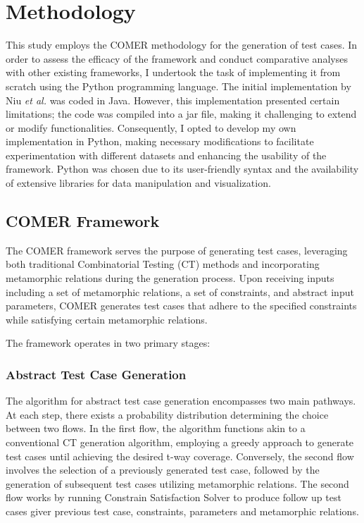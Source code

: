 
\chapter{Methodology}
\label{ch:met}

This study employs the COMER methodology for the generation of test cases.
In order to assess the efficacy of the framework and conduct comparative analyses with other existing frameworks, I undertook the task of implementing it from scratch using the Python programming language.
The initial implementation by Niu \textit{et al.} \cite{comer} was coded in Java.
However, this implementation presented certain limitations; the code was compiled into a jar file, making it challenging to extend or modify functionalities.
Consequently, I opted to develop my own implementation in Python, making necessary modifications to facilitate experimentation with different datasets and enhancing the usability of the framework.
Python was chosen due to its user-friendly syntax and the availability of extensive libraries for data manipulation and visualization.


\section{COMER Framework}\label{sec:comer-framework}

The COMER framework serves the purpose of generating test cases, leveraging both traditional Combinatorial Testing (CT) methods and incorporating metamorphic relations during the generation process.
Upon receiving inputs including a set of metamorphic relations, a set of constraints, and abstract input parameters, COMER generates test cases that adhere to the specified constraints while satisfying certain metamorphic relations.

The framework operates in two primary stages:

\subsection{Abstract Test Case Generation}\label{subsec:abstract-test-case-generation}

The algorithm for abstract test case generation encompasses two main pathways.
At each step, there exists a probability distribution determining the choice between two flows.
In the first flow, the algorithm functions akin to a conventional CT generation algorithm, employing a greedy approach to generate test cases until achieving the desired t-way coverage.
Conversely, the second flow involves the selection of a previously generated test case, followed by the generation of subsequent test cases utilizing metamorphic relations. The second flow works by running Constrain Satisfaction Solver to produce follow up test cases giver previous test case, constraints, parameters and metamorphic relations.

